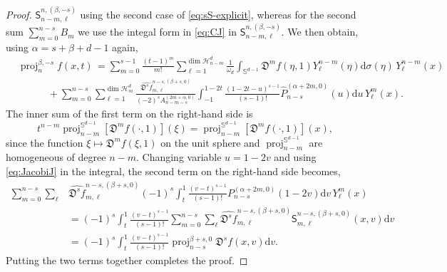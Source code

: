 \documentclass[10pt,a4paper]{amsart}
\def\CH{{\mathcal H}}
\def\a{{\alpha}}
\def\b{{\beta}}
\def\d{\mathrm{d}}
\def\fD{{\mathfrak D}}
\def\o{{\omega}}
\def\proj{\operatorname{proj}}
\def\s{\sigma}
\def\sS{{\mathsf S}}
\def\sph{{\mathbb{S}^{d-1}}}
\newcommand{\wh}{\widehat}
\begin{document}
\begin{proof}
$\sS_{n-m,\ell}^{n, (\b,-s)}$ using the second case of \eqref{eq:sS-explicit}, whereas for the second sum $\sum_{m=0}^{n-s} B_m$
we use the integal form in \eqref{eq:CJ} in $\sS_{n-m,\ell}^{n, (\b,-s)}$. We then obtain, using $\a = s+\b+d-1$ again, 
\begin{align*}
 & \proj_n^{\b,-s} f(x,t) \, = \sum_{m=0}^{s-1} \frac{(t-1)^m}{m!}
      \sum_{\ell=1}^{\dim \CH_{n-m}^d} \frac{1}{\o_d} \int_{\sph}
         \fD^{m} f(\eta,1) Y_\ell^{n-m} (\eta)\d \s(\eta)\,Y_\ell^{n-m} (x) \\
   & \qquad\quad
    + \sum_{m = 0}^{n-s} \sum_{\ell=1}^{\dim \CH_{m}^d}
       \frac{ \wh{\fD^s f}_{m,\ell}^{n-s, (\b+s,0)}}{(-2)^{s} A_{n-m-s}^{(2m+\a,0)}}
        \int_{-1}^{1-2t} \frac{(1-2t -u)^{s-1}}{(s-1)!} \wh P_{n-s}^{(\a+2m,0)}(u) \d u \, Y_\ell^m(x).
 \end{align*}
The inner sum of the first term on the right-hand side is
$$
t^{n-m} \proj_{n-m}^\sph [\fD^m f(\cdot,1)](\xi) = \proj_{n-m}^\sph [\fD^m f(\cdot,1)](x),
$$
since the function $\xi \mapsto \fD^m f(\xi,1)$ on the unit sphere and $\proj_{n-m}^\sph$ are homogeneous of degree
$n-m$. Changing variable $u = 1-2v$ and using \eqref{eq:JacobiJ} in the integral, the second term on the right-hand side becomes,
\begin{align*}
  \sum_{m = 0}^{n-s} \sum_{\ell} & \wh{\fD^s f}_{m,\ell}^{n-s, (\b+s,0)}  (-1)^s
        \int_{t}^{1} \frac{(v-t)^{s-1}}{(s-1)!} P_{n-s}^{(\a+2m,0)}(1-2v) \d v \, Y_\ell^m(x) \\
   & = (-1)^s  \int_{t}^{1}  \frac{(v-t)^{s-1}}{(s-1)!}  \sum_{m = 0}^{n-s} \sum_{\ell}
     \wh{\fD^s f}_{m,\ell}^{n-s, (\b+s,0)}  \sS_{m,\ell}^{n-s, (\b+s,0)} (x,v) \d v\\
  &  =  (-1)^s \int_{t}^{1} \frac{(v-t)^{s-1}}{(s-1)!} \proj_{n-s}^{\b+s,0}\fD^s f (x, v) \d v.
\end{align*}
Putting the two terms together completes the proof.
\end{proof}
\end{document}
